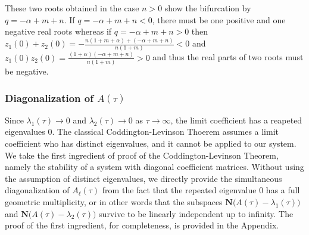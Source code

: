 \documentclass[a4paper,11pt]{article}
\theoremstyle{remark}
\begin{document}
These two roots obtained in the case $n>0$ show the bifurcation by $q=-\alpha+m+n$. If $q=-\alpha+m+n<0$, there must be one positive and one negative real roots whereas if $q=-\alpha+m+n>0$ then $z_1(0)+z_2(0) = -\frac{n(1+m+\alpha) + (-\alpha+m+n)}{n(1+m)} < 0$ and $z_1(0)z_2(0)=\frac{(1+\alpha)(-\alpha+m+n)}{n(1+m)}>0$ and thus the real parts of two roots must be negative.




\subsubsection{Diagonalization of $A(\tau)$}
Since $\lambda_1(\tau) \rightarrow 0$ and $\lambda_2(\tau) \rightarrow 0$ as $\tau \rightarrow \infty$, the limit coefficient has a reapeted eigenvalues $0$. The classical Coddington-Levinson Thoerem assumes a limit coefficient who has distinct eigenvalues, and it cannot be applied to our system. We take the first ingredient of proof of the Coddington-Levinson Theorem, namely the stability of a system with diagonal coefficient matrices. Without using the assumption of distinct eigenvalues, we directly provide the simultaneous diagonalization of $A_\ell(\tau)$ from the fact that the repeated eigenvalue $0$ has a full geometric multiplicity, or in other words that the subspaces $\mathbf{N}\Big(A(\tau)-\lambda_1(\tau)\Big)$ and  $\mathbf{N}\Big(A(\tau)-\lambda_2(\tau)\Big)$ survive to be linearly independent up to infinity. The proof of the first ingredient, for completeness, is provided in the Appendix.
\end{document}
